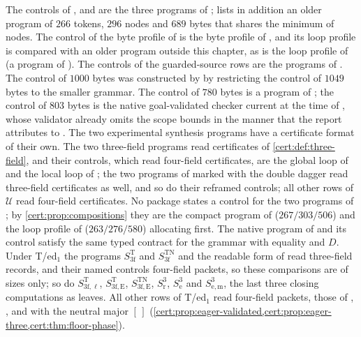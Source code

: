 The controls of ,  and
 are the three programs of
;  lists in addition an older
program of $266$ tokens, $296$ nodes and $689$ bytes that shares the minimum
of nodes. The control of the byte profile of  is the byte
profile of , and its loop profile is compared
with an older program outside this chapter, as is the loop profile of
 (a program of ). The
controls of the guarded-source rows are the programs of .
The control of $1000$ bytes was constructed by  by
restricting the control of $1049$ bytes to the smaller grammar. The control of
$780$ bytes is a program of ; the control of $803$
bytes is the native goal-validated checker current at the time of
, whose validator already omits the scope bounds in
the manner that the report attributes to . The two
experimental synthesis programs have a certificate format of their own. The
two three-field programs read certificates of \cref{cert:def:three-field}, and
their controls, which read four-field certificates, are the global loop of
 and the local loop of ; the
two programs of  marked with the double dagger read
three-field certificates as well, and so do their reframed controls; all
other rows of $\mathcal U$ read four-field certificates. No package states a
control for the two programs of ; by
\cref{cert:prop:compositions} they are the compact program of
 ($267/303/506$) and the loop profile of
 ($263/276/580$) allocating first. The native
program of  and its control satisfy the same typed contract
for the grammar with equality and $D$. Under T/ed$_1$ the programs
$S^{\mathrm T}_{3\mathrm f}$ and $S^{\mathrm{TN}}_{3\mathrm f}$ and the readable form of
 read three-field records, and their named controls
four-field packets, so these comparisons are of sizes only; so do
$S^{\mathrm T}_{3\mathrm f,\ell}$, $S^{\mathrm T}_{3\mathrm f,\mathrm E}$,
$S^{\mathrm{TN}}_{3\mathrm f,\mathrm E}$, $S^{3}_{\mathrm r}$, $S^{3}_{\mathrm e}$ and
$S^{3}_{\mathrm{e,m}}$, the last three closing computations as leaves. All other rows
of T/ed$_1$ read four-field packets, those of ,
,  and  with
the neutral major $[\,]$ (\cref{cert:prop:eager-validated,cert:prop:eager-three,cert:thm:floor-phase}).

